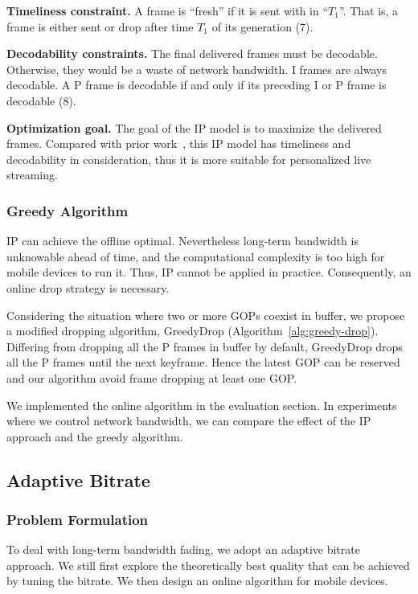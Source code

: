 \textbf{Timeliness constraint.}
A frame is ``fresh'' if it is sent with in ``$T_1$''. That is, a frame is either sent or drop after time $T_1$ of its generation (7).

\textbf{Decodability constraints.} The final delivered frames must be decodable. Otherwise, they would be a waste of network bandwidth. I frames are always decodable. A P frame is decodable if and only if its preceding I or P frame is decodable (8).

\textbf{Optimization goal.} The goal of the IP model is to maximize the delivered frames.
Compared with prior work~\cite{singh2004dynamic}, this IP model has timeliness and decodability in consideration, thus it is more suitable for personalized live streaming.


\subsubsection{Greedy Algorithm}

IP can achieve the offline optimal. Nevertheless long-term bandwidth is unknowable ahead of time, and the computational complexity is too high for mobile devices to run it. Thus, IP cannot be applied in practice. Consequently, an online drop strategy is necessary.

Considering the situation where two or more GOPs coexist in buffer, we propose a modified dropping algorithm, GreedyDrop (Algorithm~\ref{alg:greedy-drop}). Differing from dropping all the P frames in buffer by default, GreedyDrop drops all the P frames until the next keyframe. Hence the latest GOP can be reserved and our algorithm avoid frame dropping at least one GOP.

We implemented the online algorithm in the evaluation section. In experiments where we control network bandwidth, we can compare the effect of the IP approach and the greedy algorithm.

\subsection{Adaptive Bitrate}
\label{subsec:adaptive-bitrate}
\subsubsection{Problem Formulation}



To deal with long-term bandwidth fading, we adopt an adaptive bitrate approach. We still first explore the theoretically best quality that can be achieved by tuning the bitrate. We then design an online algorithm for mobile devices.

